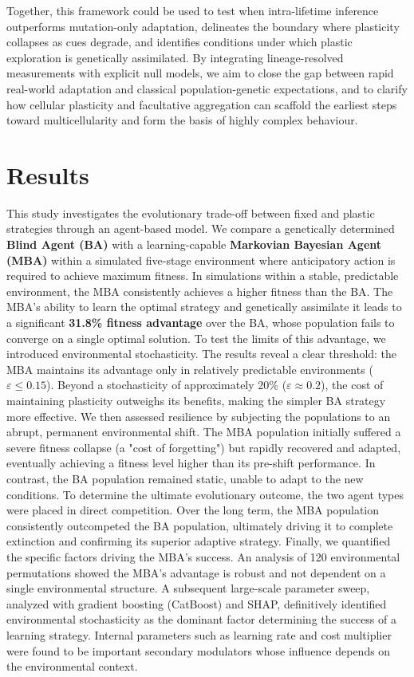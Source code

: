 \documentclass[aps,pre,twocolumn,floatfix,nofootinbib,amsmath,amssymb]{revtex4-2}
\begin{document}
Together, this framework could be used to test when intra-lifetime inference outperforms mutation-only adaptation, delineates the boundary where plasticity collapses as cues degrade, and identifies conditions under which plastic exploration is genetically assimilated. By integrating lineage-resolved measurements with explicit null models, we aim to close the gap between rapid real-world adaptation and classical population-genetic expectations, and to clarify how cellular plasticity and facultative aggregation can scaffold the earliest steps toward multicellularity and form the basis of highly complex behaviour.

\section{Results}

This study investigates the evolutionary trade-off between fixed and plastic strategies through an agent-based model. We compare a genetically determined \textbf{Blind Agent (BA)} with a learning-capable \textbf{Markovian Bayesian Agent (MBA)} within a simulated five-stage environment where anticipatory action is required to achieve maximum fitness. In simulations within a stable, predictable environment, the MBA consistently achieves a higher fitness than the BA. The MBA's ability to learn the optimal strategy and genetically assimilate it leads to a significant \textbf{31.8\% fitness advantage} over the BA, whose population fails to converge on a single optimal solution. To test the limits of this advantage, we introduced environmental stochasticity. The results reveal a clear threshold: the MBA maintains its advantage only in relatively predictable environments (\(\varepsilon \leq 0.15\)). Beyond a stochasticity of approximately 20\% (\(\varepsilon \approx 0.2\)), the cost of maintaining plasticity outweighs its benefits, making the simpler BA strategy more effective. We then assessed resilience by subjecting the populations to an abrupt, permanent environmental shift. The MBA population initially suffered a severe fitness collapse (a "cost of forgetting") but rapidly recovered and adapted, eventually achieving a fitness level higher than its pre-shift performance. In contrast, the BA population remained static, unable to adapt to the new conditions. To determine the ultimate evolutionary outcome, the two agent types were placed in direct competition. Over the long term, the MBA population consistently outcompeted the BA population, ultimately driving it to complete extinction and confirming its superior adaptive strategy. Finally, we quantified the specific factors driving the MBA's success. An analysis of 120 environmental permutations showed the MBA's advantage is robust and not dependent on a single environmental structure. A subsequent large-scale parameter sweep, analyzed with gradient boosting (CatBoost) and SHAP, definitively identified environmental stochasticity as the dominant factor determining the success of a learning strategy. Internal parameters such as learning rate and cost multiplier were found to be important secondary modulators whose influence depends on the environmental context.
\end{document}
